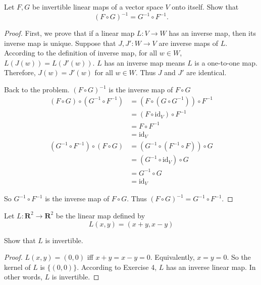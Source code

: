 \begin{exercise}
    Let $F, G$ be invertible linear maps of a vector space $V$ onto itself. Show that
    \[
        {(F \circ G)}^{-1} = G^{-1} \circ F^{-1}.
    \]
\end{exercise}

\begin{proof}
    First, we prove that if a linear map $L: V\to W$ has an inverse map, then its inverse map is unique. Suppose that $J, J': W\to V$ are inverse maps of $L$. According to the definition of inverse map, for all $w\in W$, $L(J(w)) = L(J'(w))$. $L$ has an inverse map means $L$ is a one-to-one map. Therefore, $J(w) = J'(w)$ for all $w\in W$. Thus $J$ and $J'$ are identical.

    Back to the problem. ${(F\circ G)}^{-1}$ is the inverse map of $F\circ G$
    \begin{align*}
        (F\circ G)\circ (G^{-1}\circ F^{-1}) & = (F \circ (G \circ G^{-1})) \circ F^{-1} \\
                                             & = (F \circ \text{id}_{V}) \circ F^{-1}    \\
                                             & = F \circ F^{-1}                          \\
                                             & = \text{id}_{V}                           \\
        (G^{-1}\circ F^{-1})\circ (F\circ G) & = (G^{-1}\circ (F^{-1}\circ F))\circ G    \\
                                             & = (G^{-1}\circ\text{id}_{V})\circ G       \\
                                             & = G^{-1}\circ G                           \\
                                             & = \text{id}_{V}
    \end{align*}

    So $G^{-1}\circ F^{-1}$ is the inverse map of $F\circ G$. Thus ${(F\circ G)}^{-1} = G^{-1}\circ F^{-1}$.
\end{proof}

\begin{exercise}
    Let $L: \mathbf{R}^{2} \to \mathbf{R}^{2}$ be the linear map defined by
    \[
        L(x, y) = (x+y, x-y)
    \]

    Show that $L$ is invertible.
\end{exercise}

\begin{proof}
    $L(x, y) = (0, 0)$ iff $x + y = x - y = 0$. Equivalently, $x = y = 0$. So the kernel of $L$ is $\{ (0, 0) \}$. According to Exercise 4, $L$ has an inverse linear map. In other words, $L$ is invertible.
\end{proof}

